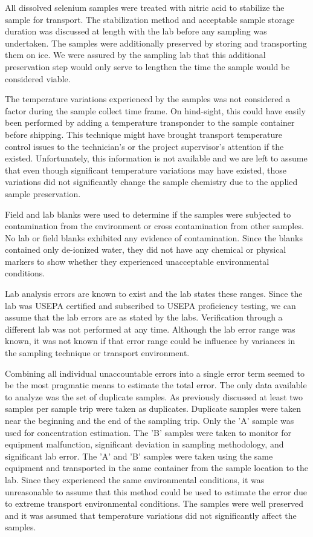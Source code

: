 All dissolved selenium samples were treated with nitric acid to stabilize the sample for transport.  The stabilization method and acceptable sample storage duration was discussed at length with the lab before any sampling was undertaken.  The samples were additionally preserved by storing and transporting them on ice.  We were assured by the sampling lab that this additional preservation step would only serve to lengthen the time the sample would be considered viable.

The temperature variations experienced by the samples was not considered a factor during the sample collect time frame.  On hind-sight, this could have easily been performed by adding a temperature transponder to the sample container before shipping.  This technique might have brought transport temperature control issues to the technician's or the project supervisor's attention if the existed.  Unfortunately, this information is not available and we are left to assume that even though significant temperature variations may have existed, those variations did not significantly change the sample chemistry due to the applied sample preservation.

Field and lab blanks were used to determine if the samples were subjected to contamination from the environment or cross contamination from other samples.  No lab or field blanks exhibited any evidence of contamination.  Since the blanks contained only de-ionized water, they did not have any chemical or physical markers to show whether they experienced unacceptable environmental conditions.

Lab analysis errors are known to exist and the lab states these ranges.  Since the lab was USEPA certified and subscribed to USEPA proficiency testing, we can assume that the lab errors are as stated by the labs.  Verification through a different lab was not performed at any time.  Although the lab error range was known,  it was not known if that error range could be influence by variances in the sampling technique or transport environment.  

Combining all individual unaccountable errors into a single error term seemed to be the most pragmatic means to estimate the total error.  The only data available to analyze was the set of duplicate samples.  As previously discussed at least two samples per sample trip were taken as duplicates.  Duplicate samples were taken near the beginning and the end of the sampling trip.  Only the 'A' sample was used for concentration estimation.  The 'B' samples were taken to monitor for equipment malfunction, significant deviation in sampling methodology, and significant lab error.  The 'A' and 'B' samples were taken using the same equipment and transported in the same container from the sample location to the lab.  Since they experienced the same environmental conditions, it was unreasonable to assume that this method could be used to estimate the error due to extreme transport environmental conditions.  The samples were well preserved and it was assumed that temperature variations did not significantly affect the samples.  

